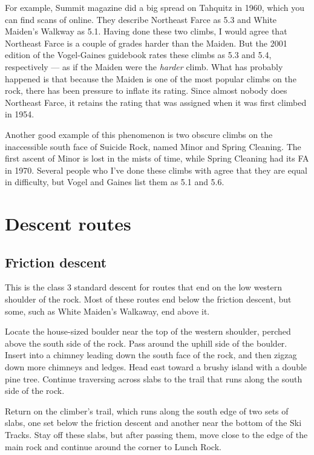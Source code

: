 \documentclass{tahquitz}
\begin{document}
For example,
Summit magazine did a big spread on Tahquitz in 1960, which you can find scans of online.
They describe Northeast Farce as 5.3 and White Maiden's Walkway as 5.1. Having done
these two climbs, I would agree that Northeast Farce is a couple of grades harder
than the Maiden. But the 2001 edition
of the Vogel-Gaines guidebook rates these climbs as 5.3 and 5.4, respectively --- as if
the Maiden were the \emph{harder} climb. What has
probably happened is that because the Maiden is one of the most popular climbs on
the rock, there has been pressure to inflate its rating. Since almost nobody does Northeast
Farce, it retains the rating that was assigned when it was first climbed in 1954.

Another good example of this phenomenon is two obscure climbs on the inaccessible
south face of Suicide Rock, named Minor and Spring Cleaning. The first ascent of Minor is
lost in the mists of time, while Spring Cleaning had its FA in 1970. Several people who
I've done these climbs with agree that they are equal in difficulty, but Vogel and Gaines
list them as 5.1 and 5.6.

\pagebreak

\section{Descent routes}

\subsection{Friction descent}\label{subsec:friction-descent}

This is the class 3 standard descent for routes that end on the low western shoulder of the rock.
Most of these routes end below the friction descent, but some, such as White Maiden's Walkaway,
end above it.

Locate the house-sized boulder near the top of the western shoulder, perched above the 
south side of the rock. Pass around the uphill
side of the boulder. Insert into a chimney leading down the south face
of the rock, and then zigzag down
more chimneys and ledges.
Head east toward a brushy island
with a double pine tree. Continue traversing across slabs to the trail that runs along the
south side of the rock.

Return on the climber's trail, which runs along the south edge of
two sets of slabs, one set below the friction descent
and another near the bottom of the Ski Tracks. Stay off these slabs,
but after passing them, move close to the edge of the main rock
and continue around the corner to Lunch Rock.
\end{document}
